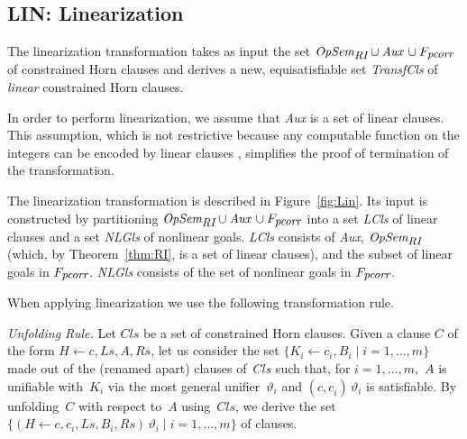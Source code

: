 \documentclass[english]{tlp}
\begin{document}
\subsection{{\bf{LIN:}} Linearization}
\label{subsec:linearization}


The {\rm linearization} transformation takes as input the set 
$\textit{OpSem}_{\textit{\small{RI}}} \cup \textit{Aux}\, \cup F_{\textit{\small{pcorr}}}$
of constrained Horn clauses and derives a new, equisatisfiable set \textit{TransfCls} of 
{\it linear} constrained Horn clauses. 

In order to perform linearization, we assume that
\textit{Aux} is a set of linear clauses.
This assumption,
which is not restrictive because any computable function on the integers can be
encoded by linear clauses \cite{SeS82}, simplifies the 
proof of termination of the transformation.

The {\rm linearization} transformation is described in Figure~\ref{fig:Lin}.
Its input is constructed  by partitioning
$\textit{OpSem}_{\textit{\small{RI}}} \cup \textit{Aux}\, \cup F_{\textit{\small{pcorr}}}$
into a set {\it LCls} of linear clauses and a set {\it NLGls} of nonlinear goals.
{\it LCls} consists of \textit{Aux}, $\textit{OpSem}_{\textit{\small{RI}}}$ 
(which, by Theorem~\ref{thm:RI}, is a set of linear clauses),
and the subset of linear goals in $F_{\textit{\small{pcorr}}}$. 
{\it NLGls} consists of the set of nonlinear goals in $F_{\textit{\small{pcorr}}}$.


When applying linearization we use the following transformation rule.

\smallskip
\noindent
{\it Unfolding  Rule.} Let $\textit{Cls}$ be a set of constrained Horn clauses.
Given a clause $C$ 
of the form $H\leftarrow c,\textit{Ls},A,\textit{Rs}$, 
let us consider the set
$\{{K}_i \leftarrow {c}_i,B_i \mid  i=1, \ldots, m\}$ 
made out of the (renamed apart) clauses of~$\textit{Cls}$ 
such that, for $i\!=\!1,\ldots,m,$ 
${A}$ is unifiable with~${K}_i$ via the most general 
unifier~$\vartheta_i$ and $({c,c}_i)\, \vartheta_i$ is satisfiable. 
By unfolding~$C$ with respect to~$A$ using~$\textit{Cls}$, we derive the set 
$\{({H}\!\leftarrow c,c_i,\textit{Ls},B_i,\textit{Rs})\,\vartheta_i\! \mid
 i\!=\!1, \ldots, m\}$ of clauses.
\end{document}
